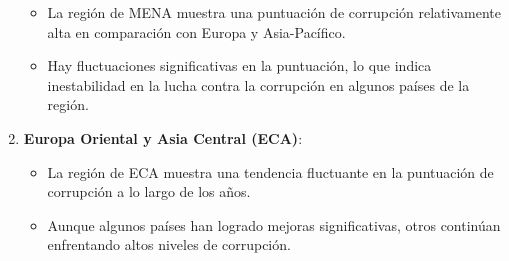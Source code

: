 \documentclass[
]{article}
\providecommand{\tightlist}{%
  \setlength{\itemsep}{0pt}\setlength{\parskip}{0pt}}
\begin{document}
\begin{enumerate}
  \begin{itemize}
  \tightlist
  \item
    La región de MENA muestra una puntuación de corrupción relativamente
    alta en comparación con Europa y Asia-Pacífico.
  \item
    Hay fluctuaciones significativas en la puntuación, lo que indica
    inestabilidad en la lucha contra la corrupción en algunos países de
    la región.
  \end{itemize}
\item
  \textbf{Europa Oriental y Asia Central (ECA)}:

  \begin{itemize}
  \tightlist
  \item
    La región de ECA muestra una tendencia fluctuante en la puntuación
    de corrupción a lo largo de los años.
  \item
    Aunque algunos países han logrado mejoras significativas, otros
    continúan enfrentando altos niveles de corrupción.
  \end{itemize}
\end{enumerate}
\end{document}
